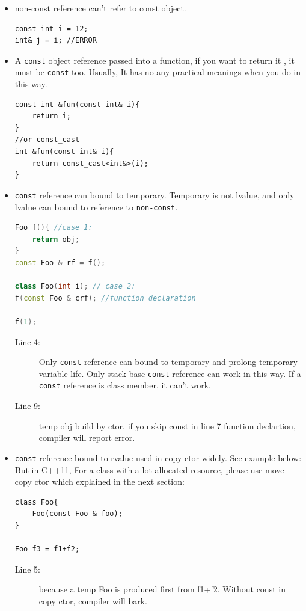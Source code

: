 \documentclass[a4paper,11pt,twoside]{book}
\begin{document}
\begin{itemize}
\item non-const reference can't refer to const object.
\begin{lstlisting}[numbers=none]
const int i = 12;
int& j = i; //ERROR
\end{lstlisting}

\item A \texttt{const} object reference passed into a function, if you want to return it , it must be \texttt{const} too. Usually, It has no any practical meanings when you do in this way. 
\begin{lstlisting}[numbers=none]
const int &fun(const int& i){ 
	return i;
}
//or const_cast 
int &fun(const int& i){ 
	return const_cast<int&>(i);
}
\end{lstlisting}

\item  \texttt{const} reference can bound to temporary. Temporary is not lvalue, and only lvalue can bound to reference to \texttt{non-const}.   
\begin{lstlisting}[frame=single, language=c++]
Foo f(){ //case 1:
	return obj;
}
const Foo & rf = f();

class Foo(int i); // case 2:
f(const Foo & crf); //function declaration

f(1);
\end{lstlisting}
\begin{description}
	\item[Line 4:] Only \texttt{const} reference can bound to temporary and prolong temporary variable life. Only stack-base \texttt{const} reference can work in this way. If a \texttt{const} reference is class member, it can't work. 
	
	\item[Line 9:] temp obj build by ctor, if you skip const in line 7 function declartion, compiler will report error.
\end{description}

	\item \texttt{const} reference bound to rvalue used in copy ctor widely. See example below: But in C++11, For a class with a lot allocated resource, please use move copy ctor which explained in the next section:

\begin{lstlisting}[numbers=none]
class Foo{
	Foo(const Foo & foo);
}

Foo f3 = f1+f2;
\end{lstlisting}
\begin{description}
	\item[Line 5:] because a temp Foo is produced first from f1+f2. Without const in copy ctor, compiler will bark.
\end{description}
\end{itemize}
\end{document}
